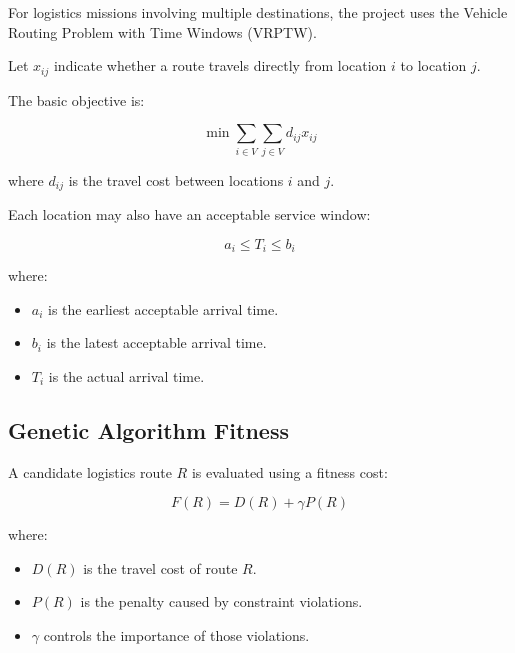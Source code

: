 \documentclass[12pt,a4paper]{article}
\begin{document}
For logistics missions involving multiple destinations, the project
uses the Vehicle Routing Problem with Time Windows (VRPTW).

Let $x_{ij}$ indicate whether a route travels directly from location
$i$ to location $j$.

The basic objective is:

\begin{equation}
    \min
    \sum_{i\in V}
    \sum_{j\in V}
    d_{ij}x_{ij}
    \label{eq:vrptw}
\end{equation}

where $d_{ij}$ is the travel cost between locations $i$ and $j$.

Each location may also have an acceptable service window:

\begin{equation}
    a_i
    \leq
    T_i
    \leq
    b_i
    \label{eq:timewindow}
\end{equation}

where:

\begin{itemize}
    \item $a_i$ is the earliest acceptable arrival time.
    \item $b_i$ is the latest acceptable arrival time.
    \item $T_i$ is the actual arrival time.
\end{itemize}





\subsection{Genetic Algorithm Fitness}

A candidate logistics route $R$ is evaluated using a fitness cost:

\begin{equation}
    F(R)
    =
    D(R)
    +
    \gamma P(R)
    \label{eq:fitness}
\end{equation}

where:

\begin{itemize}
    \item $D(R)$ is the travel cost of route $R$.
    \item $P(R)$ is the penalty caused by constraint violations.
    \item $\gamma$ controls the importance of those violations.
\end{itemize}
\end{document}
